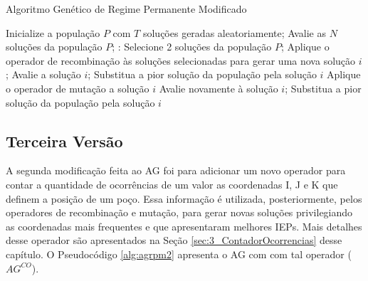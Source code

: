 \begin{algorithm}[!htbp]
  \caption{Algoritmo Genético de Regime Permanente Modificado}
  \label{alg:agrpm}
  \begin{algorithmic}
    \State Inicialize a população $P$ com $T$ soluções geradas aleatoriamente;
    \State Avalie as $N$ soluções da população $P$;
       \State:
        \State Selecione 2 soluções da população $P$;
        \State Aplique o operador de recombinação às soluções selecionadas para gerar uma nova solução $i$;
        \State Avalie a solução $i$;
          \State Substitua a pior solução da população pela solução $i$	
        \Else
          \State Aplique o operador de mutação a solução $i$	
          \State Avalie novamente à solução $i$;
            \State Substitua a pior solução da população pela solução $i$
          \EndIf
        \EndIf
      \EndFor
    \EndWhile
  \end{algorithmic}
\end{algorithm}

\subsection{Terceira Versão}
\label{sec:3_TerceiraVersao}
A segunda modificação feita ao AG foi para adicionar um novo operador para contar a quantidade de ocorrências de um valor as coordenadas I, J e K que definem a posição de um poço. Essa informação é utilizada, posteriormente, pelos operadores de recombinação e mutação, para gerar novas soluções privilegiando as coordenadas mais frequentes e que apresentaram melhores IEPs. Mais detalhes desse operador são apresentados na Seção \ref{sec:3_ContadorOcorrencias} desse capítulo. O Pseudocódigo \ref{alg:agrpm2} apresenta o AG com com tal operador ($AG^{CO}$).


